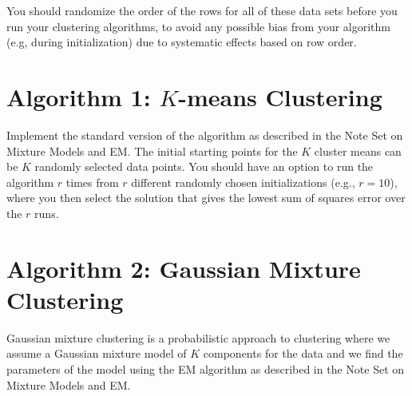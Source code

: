 \documentclass[11pt]{article}
\begin{document}
You should randomize the order of the rows for all of these data sets before you run your clustering algorithms,  to avoid any possible bias from your algorithm (e.g, during initialization) due to systematic effects based on row order.






\section*{Algorithm 1: $K$-means Clustering}
Implement the standard version of the algorithm as described in the Note Set on Mixture Models and EM.
The initial starting points for the $K$ cluster means can be $K$ randomly selected data points. You should
 have an option to run the algorithm $r$ times from $r$ different
randomly chosen initializations (e.g., $r = 10$), where you then select the solution  that gives the lowest sum of squares error over the  $r$ runs.  

\section*{Algorithm 2: Gaussian Mixture Clustering}


Gaussian mixture clustering is a probabilistic approach to clustering where 
 we assume a Gaussian mixture model of $K$ components
for the data and we find the parameters of the model using the EM algorithm as described in the Note Set on Mixture Models and EM.
 
\end{document}
